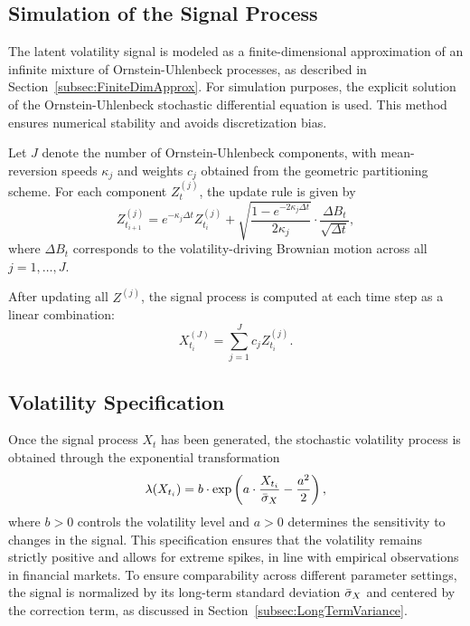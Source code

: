 \subsection{Simulation of the Signal Process} \label{subsec:SimSignalProcess}

The latent volatility signal is modeled as a finite-dimensional approximation of an infinite mixture of Ornstein-Uhlenbeck processes, as described in Section~\ref{subsec:FiniteDimApprox}. For simulation purposes, the explicit solution of the Ornstein-Uhlenbeck stochastic differential equation is used. This method ensures numerical stability and avoids discretization bias.

Let $J$ denote the number of Ornstein-Uhlenbeck components, with mean-reversion speeds $\kappa_j$ and weights $c_j$ obtained from the geometric partitioning scheme. For each component $Z_t^{(j)}$, the update rule is given by
\begin{equation} \label{eq:TimeDiscrOUExact}
    Z_{t_{i+1}}^{(j)} = e^{-\kappa_j \Delta t} Z_{t_i}^{(j)} + \sqrt{\frac{1 - e^{-2 \kappa_j \Delta t}}{2 \kappa_j}} \cdot \frac{\Delta B_t}{\sqrt{\Delta t}},
\end{equation}
where $\Delta B_t$ corresponds to the volatility-driving Brownian motion across all $j = 1,\ldots,J$.

After updating all $Z^{(j)}$, the signal process is computed at each time step as a linear combination:
\begin{equation} \label{eq:TimeDiscrSignal}
    X_{t_i}^{(J)} = \sum_{j=1}^J c_j Z_{t_i}^{(j)}.
\end{equation}


\subsection{Volatility Specification} \label{subsec:VolaSpecification}

Once the signal process $X_t$ has been generated, the stochastic volatility process is obtained through the exponential transformation
\begin{equation} \label{eq:TimeDiscrVolatility}
    \lambda(X_{t_i}) = b \cdot \exp\left( a \cdot \frac{X_{t_i}}{\Bar{\sigma}_X} - \frac{a^2}{2} \right),
\end{equation}
where $b > 0$ controls the volatility level and $a > 0$ determines the sensitivity to changes in the signal. This specification ensures that the volatility remains strictly positive and allows for extreme spikes, in line with empirical observations in financial markets. To ensure comparability across different parameter settings, the signal is normalized by its long-term standard deviation $\Bar{\sigma}_X$ and centered by the correction term, as discussed in Section~\ref{subsec:LongTermVariance}.

